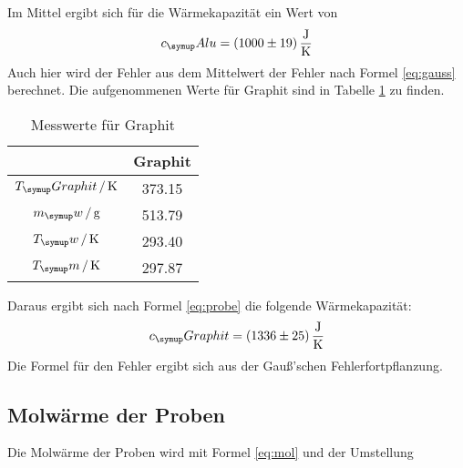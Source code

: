 Im Mittel ergibt sich für die Wärmekapazität ein Wert von
\begin{equation*}
  c_\su{Alu}=(1000\pm19)\,\si{\joule\per\kelvin}
\end{equation*}
Auch hier wird der Fehler aus dem Mittelwert der Fehler nach Formel \eqref{eq:gauss}
berechnet.
Die aufgenommenen Werte für Graphit sind in Tabelle \ref{tab:alug}
zu finden.
\begin{table}
  \centering
  \begin{tabular}{c c}
    \toprule
    \hrulefill & Graphit \\
    \midrule
    $T_\su{Graphit}\,/\Kel$& 373.15 \\
    $m_\su{w}\,/\gr$  & 513.79 \\
    $T_\su{w}\,/\Kel$ & 293.40 \\
    $T_\su{m}\,/\Kel$    & 297.87 \\
    \bottomrule
  \end{tabular}
  \caption{Messwerte für Graphit}
  \label{tab:alug}
\end{table}
Daraus ergibt sich nach Formel \eqref{eq:probe} die folgende Wärmekapazität:
\begin{equation}
  c_\su{Graphit}= (1336\pm25)\,\si{\joule\per\kelvin}
\end{equation}
Die Formel für den Fehler ergibt sich
aus der Gauß'schen Fehlerfortpflanzung.
\subsection{Molwärme der Proben}
Die Molwärme der Proben wird mit Formel \eqref{eq:mol} und der Umstellung


